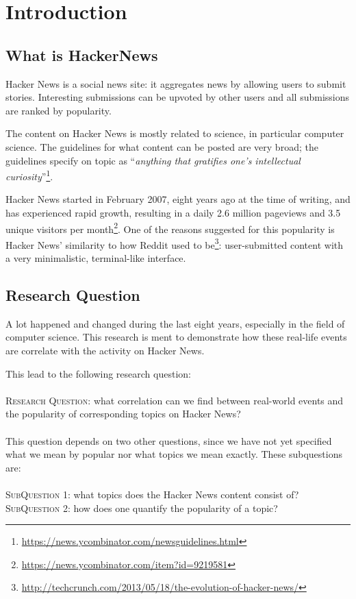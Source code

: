 \section{Introduction}
\subsection{What is HackerNews}
Hacker News is a social news site: it aggregates news by allowing users to submit stories. Interesting submissions can be upvoted by other users and all submissions are ranked by popularity.

The content on Hacker News is mostly related to science, in particular computer science. The guidelines for what content can be posted are very broad; the guidelines specify on topic as ``\textit{anything that gratifies one's intellectual curiosity}''\footnote{\url{https://news.ycombinator.com/newsguidelines.html}}.

Hacker News started in February 2007, eight years ago at the time of writing, and has experienced rapid growth, resulting in a daily 2.6 million pageviews and 3.5 unique visitors per month\footnote{\url{https://news.ycombinator.com/item?id=9219581}}. One of the reasons suggested for this popularity is Hacker News' similarity to how Reddit used to be\footnote{\url{http://techcrunch.com/2013/05/18/the-evolution-of-hacker-news/}}: user-submitted content with a very minimalistic, terminal-like interface.

\subsection{Research Question}
A lot happened and changed during the last eight years, especially in the field of computer science. This research is ment to demonstrate how these real-life events are correlate with the activity on Hacker News.

This lead to the following research question:\\
\\
\textsc{Research Question:} what correlation can we find between real-world events and the popularity of corresponding topics on Hacker News?\\
\\
This question depends on two other questions, since we have not yet specified what we mean by popular nor what topics we mean exactly. These subquestions are:\\
\\
\textsc{SubQuestion 1:} what topics does the Hacker News content consist of?\\
\textsc{SubQuestion 2:} how does one quantify the popularity of a topic?\\

